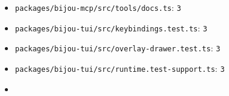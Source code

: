 \begin{itemize}
\item
  \texttt{p\allowbreak{}a\allowbreak{}c\allowbreak{}k\allowbreak{}a\allowbreak{}g\allowbreak{}e\allowbreak{}s\allowbreak{}/\allowbreak{}b\allowbreak{}i\allowbreak{}j\allowbreak{}o\allowbreak{}u\allowbreak{}-\allowbreak{}m\allowbreak{}c\allowbreak{}p\allowbreak{}/\allowbreak{}s\allowbreak{}r\allowbreak{}c\allowbreak{}/\allowbreak{}t\allowbreak{}o\allowbreak{}o\allowbreak{}l\allowbreak{}s\allowbreak{}/\allowbreak{}d\allowbreak{}o\allowbreak{}c\allowbreak{}s\allowbreak{}.\allowbreak{}t\allowbreak{}s}: \texttt{3}
\item
  \texttt{p\allowbreak{}a\allowbreak{}c\allowbreak{}k\allowbreak{}a\allowbreak{}g\allowbreak{}e\allowbreak{}s\allowbreak{}/\allowbreak{}b\allowbreak{}i\allowbreak{}j\allowbreak{}o\allowbreak{}u\allowbreak{}-\allowbreak{}t\allowbreak{}u\allowbreak{}i\allowbreak{}/\allowbreak{}s\allowbreak{}r\allowbreak{}c\allowbreak{}/\allowbreak{}k\allowbreak{}e\allowbreak{}y\allowbreak{}b\allowbreak{}i\allowbreak{}n\allowbreak{}d\allowbreak{}i\allowbreak{}n\allowbreak{}g\allowbreak{}s\allowbreak{}.\allowbreak{}t\allowbreak{}e\allowbreak{}s\allowbreak{}t\allowbreak{}.\allowbreak{}t\allowbreak{}s}: \texttt{3}
\item
  \texttt{p\allowbreak{}a\allowbreak{}c\allowbreak{}k\allowbreak{}a\allowbreak{}g\allowbreak{}e\allowbreak{}s\allowbreak{}/\allowbreak{}b\allowbreak{}i\allowbreak{}j\allowbreak{}o\allowbreak{}u\allowbreak{}-\allowbreak{}t\allowbreak{}u\allowbreak{}i\allowbreak{}/\allowbreak{}s\allowbreak{}r\allowbreak{}c\allowbreak{}/\allowbreak{}o\allowbreak{}v\allowbreak{}e\allowbreak{}r\allowbreak{}l\allowbreak{}a\allowbreak{}y\allowbreak{}-\allowbreak{}d\allowbreak{}r\allowbreak{}a\allowbreak{}w\allowbreak{}e\allowbreak{}r\allowbreak{}.\allowbreak{}t\allowbreak{}e\allowbreak{}s\allowbreak{}t\allowbreak{}.\allowbreak{}t\allowbreak{}s}: \texttt{3}
\item
  \texttt{p\allowbreak{}a\allowbreak{}c\allowbreak{}k\allowbreak{}a\allowbreak{}g\allowbreak{}e\allowbreak{}s\allowbreak{}/\allowbreak{}b\allowbreak{}i\allowbreak{}j\allowbreak{}o\allowbreak{}u\allowbreak{}-\allowbreak{}t\allowbreak{}u\allowbreak{}i\allowbreak{}/\allowbreak{}s\allowbreak{}r\allowbreak{}c\allowbreak{}/\allowbreak{}r\allowbreak{}u\allowbreak{}n\allowbreak{}t\allowbreak{}i\allowbreak{}m\allowbreak{}e\allowbreak{}.\allowbreak{}t\allowbreak{}e\allowbreak{}s\allowbreak{}t\allowbreak{}-\allowbreak{}s\allowbreak{}u\allowbreak{}p\allowbreak{}p\allowbreak{}o\allowbreak{}r\allowbreak{}t\allowbreak{}.\allowbreak{}t\allowbreak{}s}: \texttt{3}
\item

\end{itemize}
